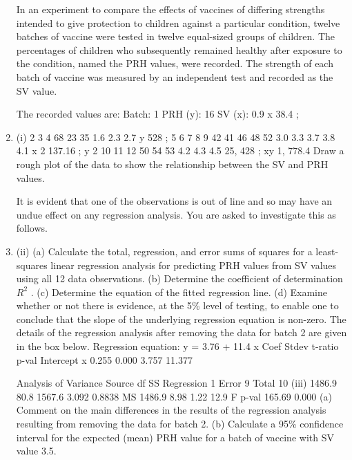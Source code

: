 \documentclass[a4paper,12pt]{article}
\begin{document}
\begin{enumerate}
In an experiment to compare the effects of vaccines of differing strengths intended to give protection to children against a particular condition, twelve batches of vaccine
were tested in twelve equal-sized groups of children. The percentages of children who subsequently remained healthy after exposure to the condition, named the PRH
values, were recorded. The strength of each batch of vaccine was measured by an independent test and recorded as the SV value.


The recorded values are:
Batch:
1
PRH (y): 16
SV (x):
0.9
x 38.4 ;
\item (i)
2
3
4
68 23 35
1.6 2.3 2.7
y
528 ;
5
6
7
8
9
42 41 46 48 52
3.0 3.3 3.7 3.8 4.1
x 2 137.16 ;
y 2
10 11 12
50 54 53
4.2 4.3 4.5
25, 428 ;
xy 1, 778.4
Draw a rough plot of the data to show the relationship between the SV and PRH values.

It is evident that one of the observations is out of line and so may have an undue effect on any regression analysis. You are asked to investigate this as follows.
\item (ii)
(a) Calculate the total, regression, and error sums of squares for a least- squares linear regression analysis for predicting PRH values from SV
values using all 12 data observations.
(b) Determine the coefficient of determination $R^2$ .
(c) Determine the equation of the fitted regression line.
(d) Examine whether or not there is evidence, at the 5\% level of testing, to enable one to conclude that the slope of the underlying regression equation is non-zero.
The details of the regression analysis after removing the data for batch 2 are given in
the box below.
Regression equation: y = 3.76 + 11.4 x
Coef
Stdev
t-ratio p-val
Intercept
x 0.255
0.000
3.757
11.377

Analysis of Variance
Source
df
SS
Regression 1
Error
9
Total
10
(iii)
1486.9
80.8
1567.6
3.092
0.8838
MS
1486.9
8.98
1.22
12.9
F p-val
165.69 0.000
(a) Comment on the main differences in the results of the regression analysis resulting from removing the data for batch 2.
(b) Calculate a 95\% confidence interval for the expected (mean) PRH value for a batch of vaccine with SV value 3.5.

\end{enumerate}

\newpage
\end{document}
